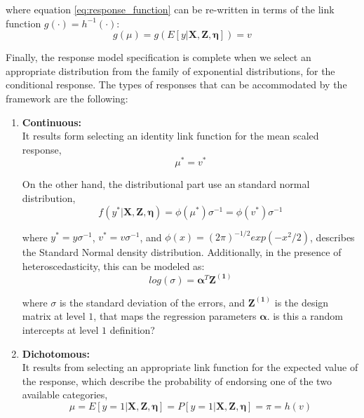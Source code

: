 \noindent where equation \ref{eq:response_function} can be re-written in terms of the link function $g(\cdot) = h^{-1}(\cdot)$:
\begin{equation} \label{eq:link_function}
	g(\mu) = g(E[y | \mathbf{X}, \mathbf{Z}, \pmb{\eta}]) = v
\end{equation}

Finally, the response model specification is complete when we select an appropriate distribution from the family of exponential distributions, for the conditional response. The types of responses that can be accommodated by the framework are the following:

\begin{enumerate}
	
	\item \textbf{Continuous:} \\
	It results form selecting an identity link function for the mean scaled response,
	\begin{equation} \label{eq:link_cont}
	\mu^{*} = v^{*}
	\end{equation}

	On the other hand, the distributional part use an standard normal distribution,
	\begin{equation} \label{eq:dist_cont}
		f(y^{*}| \mathbf{X}, \mathbf{Z}, \pmb{\eta}) = \phi(\mu^{*}) \sigma^{-1} = \phi(v^{*}) \sigma^{-1}
	\end{equation}

	where $y^{*} = y \sigma^{-1}$, $v^{*} = v \sigma^{-1}$, and $\phi(x) = (2 \pi )^{-1/2} exp(-x^{2}/2)$, describes the Standard Normal density distribution. Additionally, in the presence of heteroscedasticity, this can be modeled as:
	\begin{equation} \label{eq:het_cont}
		log(\sigma) = \pmb{\alpha}^{T}\mathbf{Z^{(1)}}
	\end{equation}
	
	where $\sigma$ is the standard deviation of the errors, and $\mathbf{Z^{(1)}}$ is the design matrix at level $1$, that maps the regression parameters $\pmb{\alpha}$. {\color{red} is this a random intercepts at level $1$ definition?}
	
	
	\item \textbf{Dichotomous:} \\
	It results from selecting an appropriate link function for the expected value of the response, which describe the probability of endorsing one of the two available categories,
	\begin{equation} \label{eq:link_dich}
		\mu = E[y=1 | \mathbf{X}, \mathbf{Z}, \pmb{\eta}] = P[y=1 | \mathbf{X}, \mathbf{Z}, \pmb{\eta}] = \pi = h(v)
	\end{equation}
	

\end{enumerate}
